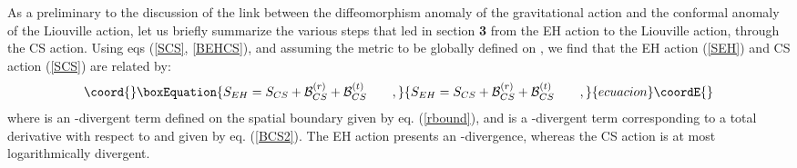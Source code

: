 \documentclass[a4paper,10pt]{article}
\begin{document}
As a preliminary to the discussion of the link between the diffeomorphism
anomaly of the gravitational action and the conformal anomaly of the
Liouville action, let us briefly summarize the various steps that led 
in section
{\bf 3} from the EH action to  the Liouville action, 
through the CS action. Using eqs (\ref{SCS}, \ref{BEHCS}), 
and assuming the metric to be globally defined on \coordHE{}, we find that
the EH action (\ref{SEH}) and CS action (\ref{SCS}) are related by:
\begin{equation}\coord{}\boxEquation{
\label{SEHSCS}
S_{EH}=S_{CS}+{\cal B}_{CS}^{(r)} +{\cal B}_{CS}^{(t)} \qquad ,
}{
S_{EH}=S_{CS}+{\cal B}_{CS}^{(r)} +{\cal B}_{CS}^{(t)} \qquad ,
}{ecuacion}\coordE{}\end{equation}
where \coordHE{} is an \coordHE{}-divergent term defined on the 
spatial boundary given by eq. (\ref{rbound}), and \coordHE{}
is a \coordHE{}-divergent term corresponding to a total derivative 
with respect to \coordHE{} and given by eq. (\ref{BCS2}).
The EH action presents an \coordHE{}-divergence, whereas the CS action 
is at most logarithmically divergent.
\end{document}
